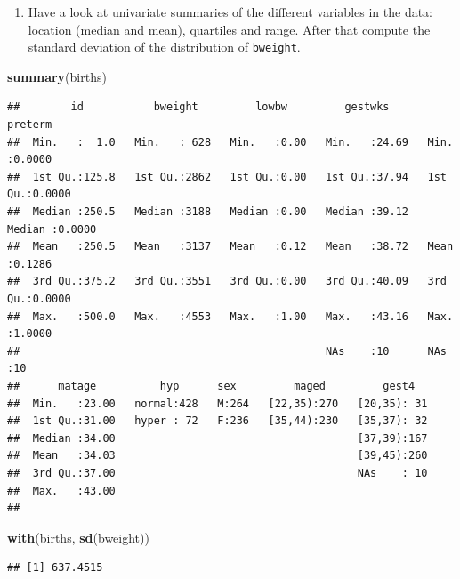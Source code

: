 \documentclass[
]{book}
\newenvironment{Shaded}{\begin{snugshade}}{\end{snugshade}}
\newcommand{\FunctionTok}[1]{\textcolor[rgb]{0.13,0.29,0.53}{\textbf{#1}}}
\newcommand{\NormalTok}[1]{#1}
\providecommand{\tightlist}{%
  \setlength{\itemsep}{0pt}\setlength{\parskip}{0pt}}
\theoremstyle{definition}
\theoremstyle{definition}
\theoremstyle{definition}
\theoremstyle{definition}
\theoremstyle{remark}
\begin{document}
\begin{enumerate}
\def\labelenumi{\arabic{enumi}.}
\setcounter{enumi}{2}
\tightlist
\item
  Have a look at univariate summaries of the different
  variables in the data:
  location (median and mean), quartiles and range. After that compute
  the standard deviation of the distribution of \texttt{bweight}.
\end{enumerate}

\begin{Shaded}
\begin{Highlighting}[]
\FunctionTok{summary}\NormalTok{(births)}
\end{Highlighting}
\end{Shaded}

\begin{verbatim}
##        id           bweight         lowbw         gestwks         preterm      
##  Min.   :  1.0   Min.   : 628   Min.   :0.00   Min.   :24.69   Min.   :0.0000  
##  1st Qu.:125.8   1st Qu.:2862   1st Qu.:0.00   1st Qu.:37.94   1st Qu.:0.0000  
##  Median :250.5   Median :3188   Median :0.00   Median :39.12   Median :0.0000  
##  Mean   :250.5   Mean   :3137   Mean   :0.12   Mean   :38.72   Mean   :0.1286  
##  3rd Qu.:375.2   3rd Qu.:3551   3rd Qu.:0.00   3rd Qu.:40.09   3rd Qu.:0.0000  
##  Max.   :500.0   Max.   :4553   Max.   :1.00   Max.   :43.16   Max.   :1.0000  
##                                                NAs    :10      NAs    :10      
##      matage          hyp      sex         maged         gest4    
##  Min.   :23.00   normal:428   M:264   [22,35):270   [20,35): 31  
##  1st Qu.:31.00   hyper : 72   F:236   [35,44):230   [35,37): 32  
##  Median :34.00                                      [37,39):167  
##  Mean   :34.03                                      [39,45):260  
##  3rd Qu.:37.00                                      NAs    : 10  
##  Max.   :43.00                                                   
## 
\end{verbatim}

\begin{Shaded}
\begin{Highlighting}[]
\FunctionTok{with}\NormalTok{(births, }\FunctionTok{sd}\NormalTok{(bweight))}
\end{Highlighting}
\end{Shaded}

\begin{verbatim}
## [1] 637.4515
\end{verbatim}
\end{document}
